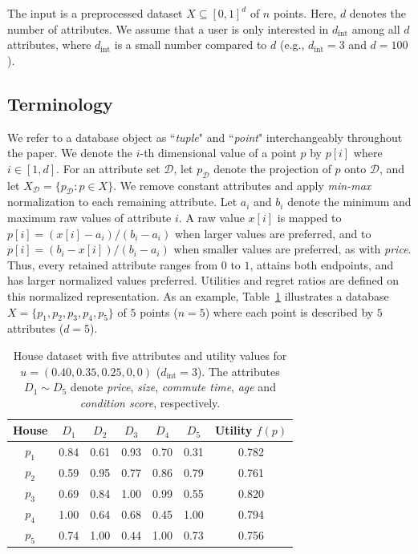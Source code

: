 \documentclass[conference]{IEEEtran}
\theoremstyle{definition}
\theoremstyle{plain}
\begin{document}
The input is a preprocessed dataset $X\subseteq[0,1]^d$ of $n$ points. Here, $d$ denotes the number of attributes. We assume that a user is only interested in $d_\text{int}$ among all $d$ attributes, where $d_\text{int}$ is a small number compared to $d$ (e.g., $d_\text{int}=3$ and $d=100$).

\subsection{Terminology}

We refer to a database object as ``\textit{tuple}" and ``\textit{point}" interchangeably throughout the paper. We denote the $i$-th dimensional value of a point $p$ by $p[i]$ where $i \in [1,d]$. For an attribute set $\mathcal{D}$, let $p_{\mathcal{D}}$ denote the projection of $p$ onto $\mathcal{D}$, and let $X_{\mathcal{D}}=\{p_{\mathcal{D}}:p\in X\}$. We remove constant attributes and apply \textit{min-max} normalization to each remaining attribute. Let $a_i$ and $b_i$ denote the minimum and maximum raw values of attribute $i$. A raw value $x[i]$ is mapped to $p[i]=(x[i]-a_i)/(b_i-a_i)$ when larger values are preferred, and to $p[i]=(b_i-x[i])/(b_i-a_i)$ when smaller values are preferred, as with \textit{price}. Thus, every retained attribute ranges from $0$ to $1$, attains both endpoints, and has larger normalized values preferred. Utilities and regret ratios are defined on this normalized representation. As an example, Table~\ref{tab:house} illustrates a database $X=\{p_1, p_2, p_3, p_4, p_5\}$ of $5$ points ($n=5$) where each point is described by $5$ attributes ($d=5$).

\begin{table}[!t]
\centering
\begin{tabular}{|c|c|c|c|c|c|c|}
\hline
\textbf{House} & $D_1$ & $D_2$ & $D_3$ & $D_4$ & $D_5$ & \textbf{Utility} $f(p)$ \\
\hline
$p_1$ & 0.84 & 0.61 & 0.93 & 0.70 & 0.31 & 0.782 \\
\hline
$p_2$ & 0.59 & 0.95 & 0.77 & 0.86 & 0.79 & 0.761 \\
\hline
$p_3$ & 0.69 & 0.84 & 1.00 & 0.99 & 0.55 & 0.820 \\
\hline
$p_4$ & 1.00 & 0.64 & 0.68 & 0.45 & 1.00 & 0.794 \\
\hline
$p_5$ & 0.74 & 1.00 & 0.44 & 1.00 & 0.73 & 0.756 \\
\hline
\end{tabular}
\caption{House dataset with five attributes and utility values for
$u=(0.40,0.35,0.25,0,0)$ ($d_\text{int}=3$).
The attributes $D_1\!\sim\!D_5$ denote \textit{price}, \textit{size}, \textit{commute time}, \textit{age} and \textit{condition score}, respectively.}
\label{tab:house}
\end{table}
\end{document}
